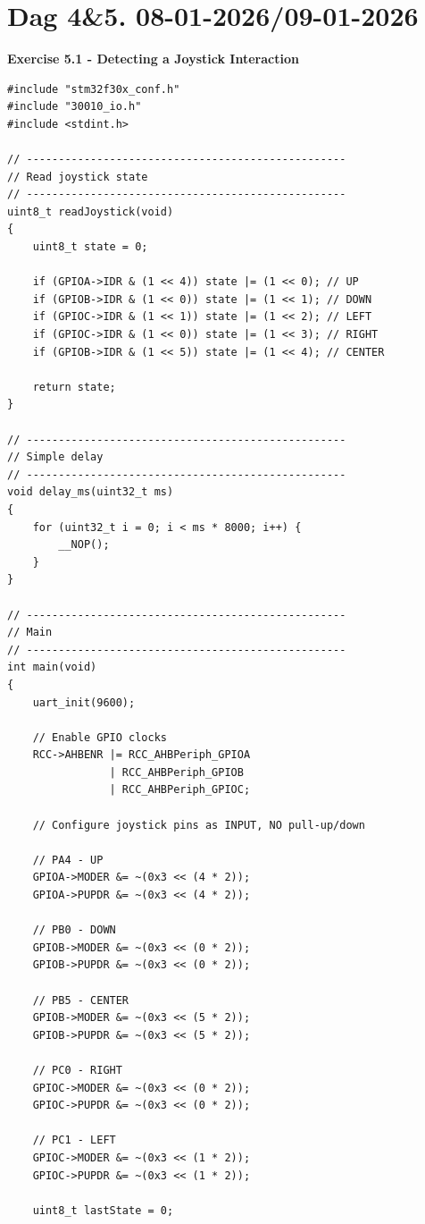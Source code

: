 \section*{Dag 4\&5. 08-01-2026/09-01-2026}
\vspace{1em}

\textbf{Exercise 5.1 - Detecting a Joystick Interaction}
\begin{lstlisting}
#include "stm32f30x_conf.h"
#include "30010_io.h"
#include <stdint.h>

// --------------------------------------------------
// Read joystick state
// --------------------------------------------------
uint8_t readJoystick(void)
{
    uint8_t state = 0;

    if (GPIOA->IDR & (1 << 4)) state |= (1 << 0); // UP
    if (GPIOB->IDR & (1 << 0)) state |= (1 << 1); // DOWN
    if (GPIOC->IDR & (1 << 1)) state |= (1 << 2); // LEFT
    if (GPIOC->IDR & (1 << 0)) state |= (1 << 3); // RIGHT
    if (GPIOB->IDR & (1 << 5)) state |= (1 << 4); // CENTER

    return state;
}

// --------------------------------------------------
// Simple delay
// --------------------------------------------------
void delay_ms(uint32_t ms)
{
    for (uint32_t i = 0; i < ms * 8000; i++) {
        __NOP();
    }
}

// --------------------------------------------------
// Main
// --------------------------------------------------
int main(void)
{
    uart_init(9600);

    // Enable GPIO clocks
    RCC->AHBENR |= RCC_AHBPeriph_GPIOA
                | RCC_AHBPeriph_GPIOB
                | RCC_AHBPeriph_GPIOC;

    // Configure joystick pins as INPUT, NO pull-up/down

    // PA4 - UP
    GPIOA->MODER &= ~(0x3 << (4 * 2));
    GPIOA->PUPDR &= ~(0x3 << (4 * 2));

    // PB0 - DOWN
    GPIOB->MODER &= ~(0x3 << (0 * 2));
    GPIOB->PUPDR &= ~(0x3 << (0 * 2));

    // PB5 - CENTER
    GPIOB->MODER &= ~(0x3 << (5 * 2));
    GPIOB->PUPDR &= ~(0x3 << (5 * 2));

    // PC0 - RIGHT
    GPIOC->MODER &= ~(0x3 << (0 * 2));
    GPIOC->PUPDR &= ~(0x3 << (0 * 2));

    // PC1 - LEFT
    GPIOC->MODER &= ~(0x3 << (1 * 2));
    GPIOC->PUPDR &= ~(0x3 << (1 * 2));

    uint8_t lastState = 0;


\end{lstlisting}
